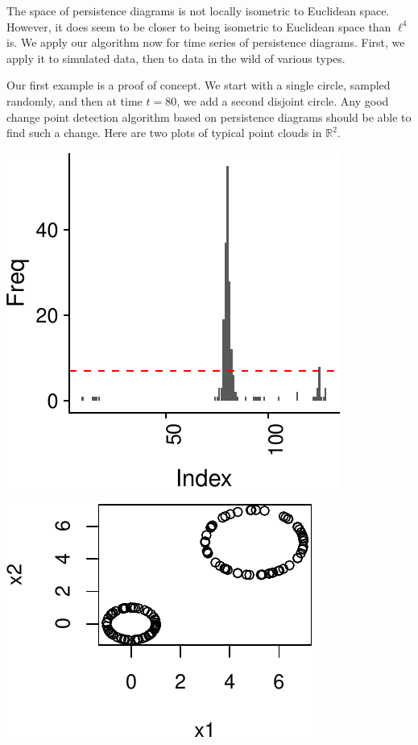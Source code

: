 \documentclass[smallextended]{svjour3}       %
\begin{document}
The space of persistence diagrams is not locally isometric to Euclidean
space. However, it does seem to be closer to being isometric to
Euclidean space than \(\ell^4\) is. We apply our algorithm now for time
series of persistence diagrams. First, we apply it to simulated data,
then to data in the wild of various types.

Our first example is a proof of concept. We start with a single circle,
sampled randomly, and then at time \(t = 80\), we add a second disjoint
circle. Any good change point detection algorithm based on persistence
diagrams should be able to find such a change. Here are two plots of
typical point clouds in \(\mathbb{R}^2\).

\begin{center}\includegraphics{springer_template_files/figure-latex/unnamed-chunk-6-1} \end{center}

\begin{center}\includegraphics{springer_template_files/figure-latex/unnamed-chunk-6-2} \end{center}
\end{document}
